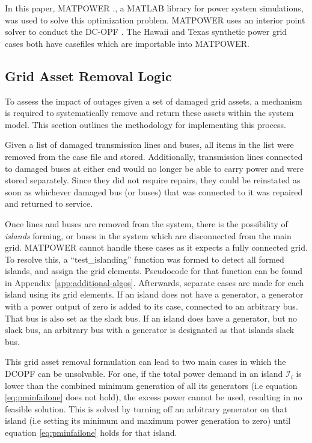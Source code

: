 \documentclass[12pt]{article}
\begin{document}
In this paper, MATPOWER \cite{zimmerman}., a MATLAB library for power system simulations, was used to solve this optimization problem. MATPOWER uses an interior point solver to conduct the DC-OPF \cite{zimmerman}. The Hawaii and Texas synthetic power grid cases both have casefiles which are importable into MATPOWER. \par

\subsection{Grid Asset Removal Logic}
To assess the impact of outages given a set of damaged grid assets, a mechanism is required to systematically remove and return these assets within the system model. This section outlines the methodology for implementing this process. \par
Given a list of damaged transmission lines and buses, all items in the list were removed from the case file and stored. Additionally, transmission lines connected to damaged buses at either end would no longer be able to carry power and were stored separately. Since they did not require repairs, they could be reinstated as soon as whichever damaged bus (or buses) that was connected to it was repaired and returned to service. \par
Once lines and buses are removed from the system, there is the possibility of \textit{islands} forming, or buses in the system which are disconnected from the main grid. MATPOWER cannot handle these cases as it expects a fully connected grid. To resolve this, a “test\_islanding” function was formed to detect all formed islands, and assign the grid elements. Pseudocode for that function can be found in Appendix~\ref{app:additional-algos}. Afterwards, separate cases are made for each island using its grid elements. If an island does not have a generator, a generator with a power output of zero is added to its case, connected to an arbitrary bus. That bus is also set as the slack bus. If an island does have a generator, but no slack bus, an arbitrary bus with a generator is designated as that islands slack bus. \par
This grid asset removal formulation can lead to two main cases in which the DCOPF can be unsolvable. For one, if the total power demand in an island $\mathcal{I}_i$ is lower than the combined minimum generation of all its generators (i.e equation \eqref{eq:pminfailone} does not hold), the excess power cannot be used, resulting in no feasible solution. This is solved by turning off an arbitrary generator on that island (i.e setting its minimum and maximum power generation to zero) until equation \eqref{eq:pminfailone} holds for that island. 
\end{document}
